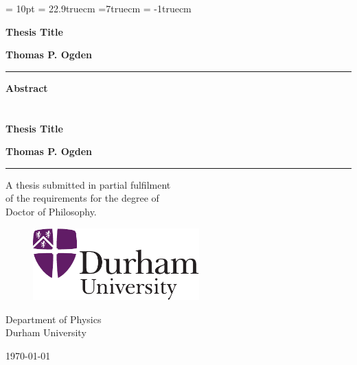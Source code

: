 \documentclass[a4paper,12pt,oneside,linespread]{report}
\newcommand{\thesistitle}{Thesis Title}
\newcommand{\myname}{Thomas P. Ogden}
\begin{document}



  \lhead{\nouppercase{\it \leftmark}}             %
  \rhead{\thepage}                                %
  \headheight = 10pt \textheight = 22.9truecm \leftmargin =7truecm
  \voffset    = -1truecm \raggedbottom \cfoot{}

  \parindent 0pt

  \thispagestyle{empty}
  \vspace{-1cm}
  \begin{center}
  {\huge \textbf{\thesistitle}}
  \\
  \vspace{0.8cm} {\Large \textbf{\myname}\\\rule{7cm}{0.2mm}}
  \end{center}
  \vspace{0.6cm}
  {\large \textbf{Abstract}}


  \newpage

  \chapter*{}
  \thispagestyle{empty} 
  \vspace{-1cm}
  \begin{center}
  {\huge\textbf{\thesistitle}\par}

  \vspace{1.5cm} {\Large{\textbf{\myname}}}
  \par
  \rule{8cm}{0.2mm} \vspace{0.7cm} \par {A thesis submitted in
  partial fulfilment \\of the requirements for the degree of
  \\Doctor of Philosophy.}
  \vspace{3.0truecm} %
  \par
  \begin{figure}[h]
  \centering \includegraphics[width=6.4cm]{figs/crest.pdf}
  \end{figure}

  {\large Department of Physics} \vspace{0.15cm}\\{\large Durham
  University} \vspace{0.5cm}
  \\
  \begin{large}
  \today
  \end{large}
  \end{center}
\end{document}
